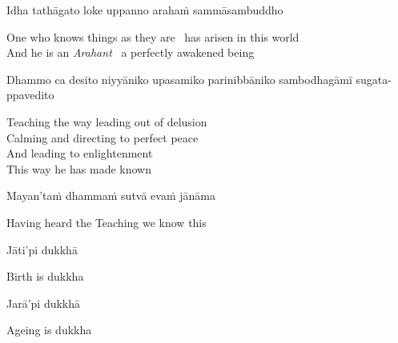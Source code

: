 Idha tathāgato loke uppanno arahaṁ sammāsambuddho

\begin{english}
  One who knows things as they are \breathmark\ has arisen in this world\makeatletter\hyperlink{endnote12-appendix}\makeatother\\

  And he is an \textit{Arahant} \breathmark\ a perfectly awakened being
\end{english}

\begin{pali-hang}
  Dhammo ca desito niyyāniko upasamiko parinibbāniko sambodhagāmī sugata-ppavedito
\end{pali-hang}

\begin{english-verses}
  Teaching the way leading out of delusion\makeatletter\hyperlink{endnote13-appendix}\makeatother\\
  Calming and directing to perfect peace\\
  And leading to enlightenment\\
  This way he has made known\\
\end{english-verses}

Mayan'taṁ dhammaṁ sutvā evaṁ jānāma

\begin{english}
  Having heard the Teaching we know this
\end{english}

\suttaRef{[Thai]}

Jāti'pi dukkhā

\begin{english}
  Birth is dukkha
\end{english}

Jarā'pi dukkhā

\begin{english}
  Ageing is dukkha
\end{english}


